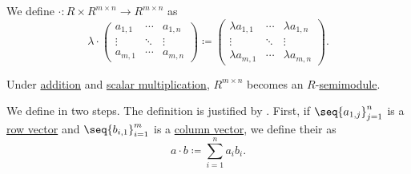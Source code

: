 \begin{proposition}
\begin{thmenum}
     We define  \( \cdot: R \times R^{m \times n} \to R^{m \times n} \) as
    \begin{equation*}
       \lambda \cdot \begin{pmatrix}
        a_{1,1} & \cdots & a_{1,n} \\
        \vdots  & \ddots & \vdots  \\
        a_{m,1} & \cdots & a_{m,n}
      \end{pmatrix}
      \coloneqq
      \begin{pmatrix}
        \lambda a_{1,1} & \cdots & \lambda a_{1,n} \\
        \vdots          & \ddots & \vdots          \\
        \lambda a_{m,1} & \cdots & \lambda a_{m,n}
      \end{pmatrix}.
    \end{equation*}

    Under \hyperref[def:matrix_algebra/addition]{addition} and \hyperref[def:matrix_algebra/scalar_multiplication]{scalar multiplication}, \( R^{m \times n} \) becomes an \( R \)-\hyperref[def:semimodule]{semimodule}.

     We define  in two steps. The definition is justified by . First, if \( \seq{ a_{1,j} }_{j=1}^n \) is a \hyperref[def:array/row_vector]{row vector} and \( \seq{ b_{i,1} }_{i=1}^m \) is a \hyperref[def:array/column_vector]{column vector}, we define their  as
    \begin{equation*}
      a \cdot b \coloneqq \sum_{i=1}^n a_i b_i.
    \end{equation*}


\end{thmenum}
\end{proposition}
